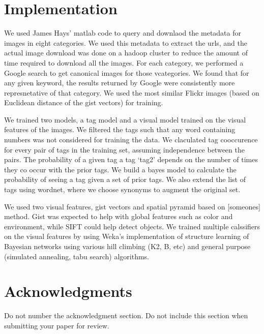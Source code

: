 \documentclass[12pt]{article}
\begin{document}
\section{Implementation}
We used James Hays' matlab code to query and downlaod the metadata for images
in eight categories. We used this metadata to extract the urls, and the actual
image download was done on a hadoop cluster to reduce the amount of time
required to download all the images.
For each category, we performed a Google search to get canonical images for
those vcategories. We found that for any given keyword, the results returned
by Google were consistently more represnetative of that category. We used the
most similar Flickr images (based on Euclidean distance of the gist vectors)
for training.

We trained two models, a tag model and a visual model trained on the visual
features of the images. We filtered the tags such that any word containing
numbers was not considered for training the data. We claculated tag
cooccurence for every pair of tags in the training set, assuming independence
between the pairs. The probability of a given tag  a tag `tag2' depends
on the number of times they co occur with the prior tags. We build a bayes
model to calculate the probability of seeing a tag given a set of prior tags.
We also extend the list of tags using wordnet, where we choose synonyms to
augment the original set.

We used two visual features, gist vectors and spatial pyramid based on
[someones] method. Gist was expected to help with global features such as
color and environment, while SIFT could help detect objects. We trained multiple
calssifiers on the visual features by using Weka's implementation of structure
learning of Bayesian networks using various hill climbing (K2, B, etc) and
general purpose (simulated annealing, tabu search) algorithms.


\section*{Acknowledgments}

Do not number the acknowledgment section. Do not include this section
when submitting your paper for review.
\end{document}
